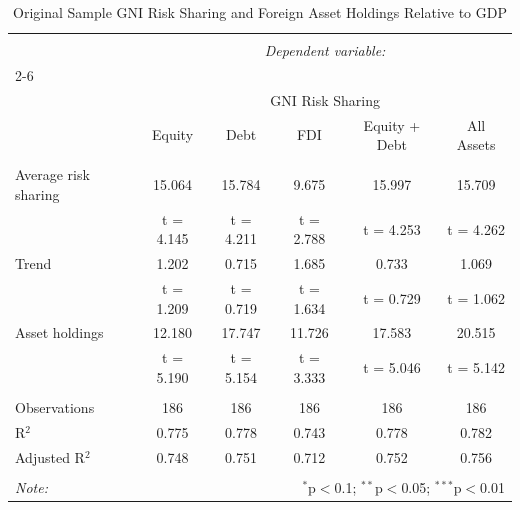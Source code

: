 
\begin{table}[!htbp] \centering 
  \caption{Original Sample GNI Risk Sharing and Foreign Asset Holdings Relative to GDP} 
  \label{} 
\begin{tabular}{@{\extracolsep{5pt}}lccccc} 
\\[-1.8ex]\hline 
\hline \\[-1.8ex] 
 & \multicolumn{5}{c}{\textit{Dependent variable:}} \\ 
\cline{2-6} 
\\[-1.8ex] & \multicolumn{5}{c}{GNI Risk Sharing} \\ 
 & Equity & Debt & FDI & Equity + Debt & All Assets \\ 
\hline \\[-1.8ex] 
 Average risk sharing & 15.064 & 15.784 & 9.675 & 15.997 & 15.709 \\ 
  & t = 4.145 & t = 4.211 & t = 2.788 & t = 4.253 & t = 4.262 \\ 
  Trend & 1.202 & 0.715 & 1.685 & 0.733 & 1.069 \\ 
  & t = 1.209 & t = 0.719 & t = 1.634 & t = 0.729 & t = 1.062 \\ 
  Asset holdings & 12.180 & 17.747 & 11.726 & 17.583 & 20.515 \\ 
  & t = 5.190 & t = 5.154 & t = 3.333 & t = 5.046 & t = 5.142 \\ 
 \hline \\[-1.8ex] 
Observations & 186 & 186 & 186 & 186 & 186 \\ 
R$^{2}$ & 0.775 & 0.778 & 0.743 & 0.778 & 0.782 \\ 
Adjusted R$^{2}$ & 0.748 & 0.751 & 0.712 & 0.752 & 0.756 \\ 
\hline 
\hline \\[-1.8ex] 
\textit{Note:}  & \multicolumn{5}{r}{$^{*}$p$<$0.1; $^{**}$p$<$0.05; $^{***}$p$<$0.01} \\ 
\end{tabular} 
\end{table} 
